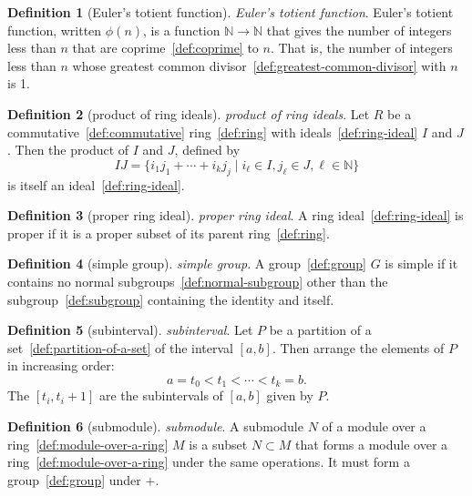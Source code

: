 \documentclass[12pt,a4paper]{article}
\theoremstyle{definition}
\newtheorem{definition}{Definition}
\begin{document}
\begin{definition}[Euler's totient function]\label{def:euler's-totient-function}
\emph{Euler's totient function}. Euler's totient function, written $\phi(n)$, is a function $\mathbb N\to\mathbb N$ that gives the number of integers less than $n$ that are coprime~\ref{def:coprime} to $n$. That is, the number of integers less than $n$ whose greatest common divisor~\ref{def:greatest-common-divisor} with $n$ is 1.
\end{definition}

\begin{definition}[product of ring ideals]\label{def:product-of-ring-ideals}
\emph{product of ring ideals}. Let $R$ be a commutative~\ref{def:commutative} ring~\ref{def:ring} with ideals~\ref{def:ring-ideal} $I$ and $J$. Then the product of $I$ and $J$, defined by $$IJ= \{i_1j_1+\cdots + i_kj_j \mid i_\ell\in I,j_\ell\in J, \ell \in \mathbb N\}$$ is itself an ideal~\ref{def:ring-ideal}.
\end{definition}

\begin{definition}[proper ring ideal]\label{def:proper-ring-ideal}
\emph{proper ring ideal}. A ring ideal~\ref{def:ring-ideal} is proper if it is a proper subset of its parent ring~\ref{def:ring}.
\end{definition}

\begin{definition}[simple group]\label{def:simple-group}
\emph{simple group}. A group~\ref{def:group} $G$ is simple if it contains no normal subgroups~\ref{def:normal-subgroup} other than the subgroup~\ref{def:subgroup} containing the identity and itself.
\end{definition}

\begin{definition}[subinterval]\label{def:subinterval}
\emph{subinterval}. Let $P$ be a partition of a set~\ref{def:partition-of-a-set} of the interval $[a,b]$. Then arrange the elements of $P$ in increasing order: $$a = t_0 < t_1< \cdots< t_k = b.$$ The $[t_i, t_i+1]$ are the subintervals of $[a,b]$ given by $P$.
\end{definition}

\begin{definition}[submodule]\label{def:submodule}
\emph{submodule}. A submodule $N$ of a module over a ring~\ref{def:module-over-a-ring} $M$ is a subset $N\subset M$ that forms a module over a ring~\ref{def:module-over-a-ring} under the same operations. It must form a group~\ref{def:group} under $+$.
\end{definition}
\end{document}
